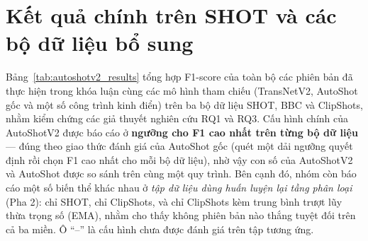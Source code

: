 \section{Kết quả chính trên SHOT và các bộ dữ liệu bổ sung}
\label{sec:main_results}

Bảng~\ref{tab:autoshotv2_results} tổng hợp F1-score của toàn bộ các phiên bản đã thực hiện trong khóa luận cùng các mô hình tham chiếu (TransNetV2, AutoShot gốc và một số công trình kinh điển) trên ba bộ dữ liệu SHOT, BBC và ClipShots, nhằm kiểm chứng các giả thuyết nghiên cứu RQ1 và RQ3. Cấu hình chính của AutoShotV2 được báo cáo ở \textbf{ngưỡng cho F1 cao nhất trên từng bộ dữ liệu} --- đúng theo giao thức đánh giá của AutoShot gốc (quét một dải ngưỡng quyết định rồi chọn F1 cao nhất cho mỗi bộ dữ liệu), nhờ vậy con số của AutoShotV2 và AutoShot được so sánh trên cùng một quy trình. Bên cạnh đó, nhóm còn báo cáo một số biến thể khác nhau ở \textit{tập dữ liệu dùng huấn luyện lại tầng phân loại} (Pha 2): chỉ SHOT, chỉ ClipShots, và chỉ ClipShots kèm trung bình trượt lũy thừa trọng số (EMA), nhằm cho thấy không phiên bản nào thắng tuyệt đối trên cả ba miền. Ô ``--'' là cấu hình chưa được đánh giá trên tập tương ứng.

